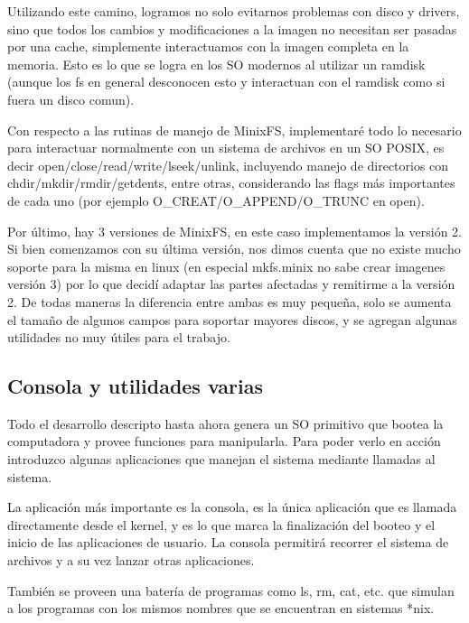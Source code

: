 Utilizando este camino, logramos no solo evitarnos problemas con disco y
drivers, sino que todos los cambios y modificaciones a la imagen no necesitan
ser pasadas por una cache, simplemente interactuamos con la imagen completa en
la memoria. Esto es lo que se logra en los SO modernos al utilizar un ramdisk
(aunque los fs en general desconocen esto y interactuan con el ramdisk como si
fuera un disco comun).

Con respecto a las rutinas de manejo de MinixFS, implementaré todo lo necesario
para interactuar normalmente con un sistema de archivos en un SO POSIX, es decir
open/close/read/write/lseek/unlink, incluyendo manejo de directorios con
chdir/mkdir/rmdir/getdents, entre otras, considerando las flags más importantes
de cada uno (por ejemplo O\_CREAT/O\_APPEND/O\_TRUNC en open).

Por último, hay 3 versiones de MinixFS, en este caso implementamos la versión 2.
Si bien comenzamos con su última versión, nos dimos cuenta que no existe mucho
soporte para la misma en linux (en especial mkfs.minix no sabe crear imagenes
versión 3) por lo que decidí adaptar las partes afectadas y remitirme a la
versión 2. De todas maneras la diferencia entre ambas es muy pequeña, solo se
aumenta el tamaño de algunos campos para soportar mayores discos, y se agregan
algunas utilidades no muy útiles para el trabajo.

\subsection{Consola y utilidades varias}

Todo el desarrollo descripto hasta ahora genera un SO primitivo que bootea la
computadora y provee funciones para manipularla. Para poder verlo en acción
introduzco algunas aplicaciones que manejan el sistema mediante llamadas al
sistema.

La aplicación más importante es la consola, es la única aplicación que es
llamada directamente desde el kernel, y es lo que marca la finalización del
booteo y el inicio de las aplicaciones de usuario. La consola permitirá recorrer
el sistema de archivos y a su vez lanzar otras aplicaciones.

También se proveen una batería de programas como ls, rm, cat, etc. que simulan a
los programas con los mismos nombres que se encuentran en sistemas *nix.
